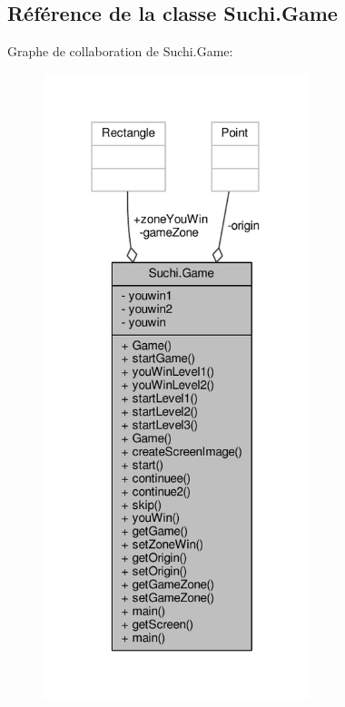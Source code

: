 \hypertarget{classSuchi_1_1Game}{}\subsection{Référence de la classe Suchi.\+Game}
\label{classSuchi_1_1Game}


Graphe de collaboration de Suchi.\+Game\+:\nopagebreak
\begin{figure}[H]
\begin{center}
\leavevmode
\includegraphics[width=220pt]{classSuchi_1_1Game__coll__graph}
\end{center}
\end{figure}
